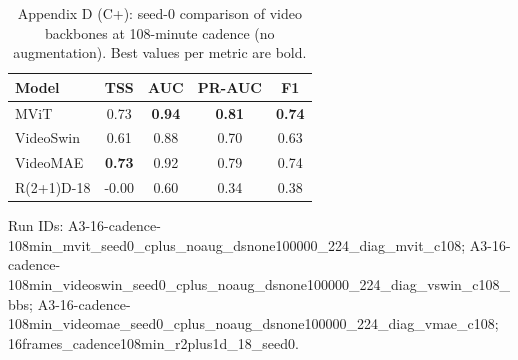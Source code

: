 \begin{table}[p]
\centering
\scriptsize
\caption{Appendix D (C+): seed-0 comparison of video backbones at 108-minute cadence (no augmentation). Best values per metric are bold.}
\label{tab:appD_c_reordered}
\begin{tabular}{lcccc}
\toprule
Model & TSS & AUC & PR-AUC & F1 \\
\midrule
MViT & 0.73 & \textbf{0.94} & \textbf{0.81} & \textbf{0.74} \\
VideoSwin & 0.61 & 0.88 & 0.70 & 0.63 \\
VideoMAE & \textbf{0.73} & 0.92 & 0.79 & 0.74 \\
R(2+1)D-18 & -0.00 & 0.60 & 0.34 & 0.38 \\
\bottomrule
\end{tabular}
\vspace{1mm}
\begin{flushleft}\scriptsize Run IDs: A3-16-cadence-108min\_mvit\_seed0\_cplus\_noaug\_dsnone100000\_224\_diag\_mvit\_c108; A3-16-cadence-108min\_videoswin\_seed0\_cplus\_noaug\_dsnone100000\_224\_diag\_vswin\_c108\_bbs; A3-16-cadence-108min\_videomae\_seed0\_cplus\_noaug\_dsnone100000\_224\_diag\_vmae\_c108; 16frames\_cadence108min\_r2plus1d\_18\_seed0.\end{flushleft}
\end{table}
